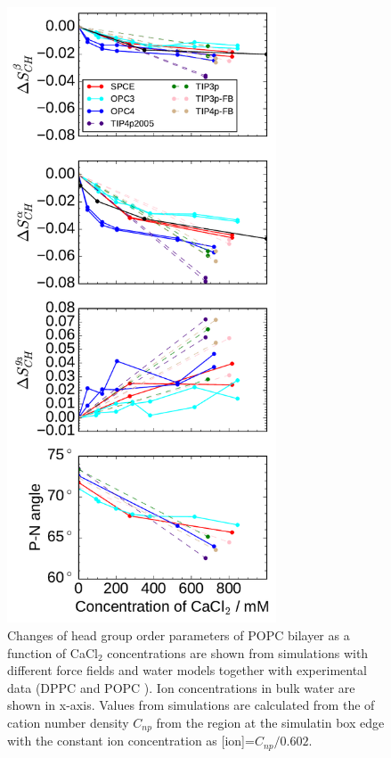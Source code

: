 \documentclass[aip,jcp,twocolumn]{revtex4}
\begin{document}
\begin{figure}[tbp]
  \centering
  \includegraphics[width=8.0cm]{../Fig/ipython_nb/PN_angle_OrdPars-A-B-g3_L14-ECCL17_q80_sig89_CaCl_waterModels.pdf}
  \caption{\label{fig:ordPars_waterModels}
    Changes of head group order parameters of POPC bilayer as a function of CaCl$_2$ concentrations
    are shown from simulations with different force fields and water models together with experimental data 
    (DPPC \cite{akutsu81} and POPC \cite{altenbach84}). 
    Ion concentrations in bulk water are shown in x-axis. 
    Values from simulations are calculated from the of cation number density $C_{np}$
    from the region at the simulatin box edge with the constant ion concentration as [ion]=$C_{np}/0.602$.
  }
\end{figure}
\end{document}
